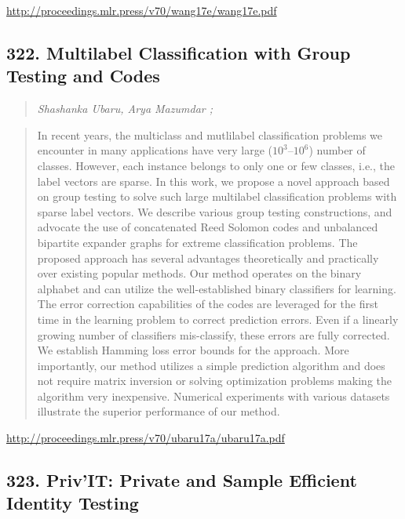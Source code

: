 \documentclass{article}
\begin{document}
\href{http://proceedings.mlr.press/v70/wang17e/wang17e.pdf}{http://proceedings.mlr.press/v70/wang17e/wang17e.pdf}

\subsection{322. Multilabel Classification with Group Testing and Codes}

\begin{quote}
\footnotesize{\textit{Shashanka Ubaru, Arya Mazumdar ;}}

\end{quote}

\begin{quote}
    In recent years, the multiclass and mutlilabel classification problems we encounter in many applications have very large ($10^3$–$10^6$) number of classes. However, each instance belongs to only one or few classes, i.e., the label vectors are sparse. In this work, we propose a novel approach based on group testing to solve such large multilabel classification problems with sparse label vectors. We describe various group testing constructions, and advocate the use of concatenated Reed Solomon codes and unbalanced bipartite expander graphs for extreme classification problems. The proposed approach has several advantages theoretically and practically over existing popular methods. Our method operates on the binary alphabet and can utilize the well-established binary classifiers for learning. The error correction capabilities of the codes are leveraged for the first time in the learning problem to correct prediction errors. Even if a linearly growing number of classifiers mis-classify, these errors are fully corrected. We establish Hamming loss error bounds for the approach. More importantly, our method utilizes a simple prediction algorithm and does not require matrix inversion or solving optimization problems making the algorithm very inexpensive. Numerical experiments with various datasets illustrate the superior performance of our method.  
\end{quote}

\href{http://proceedings.mlr.press/v70/ubaru17a/ubaru17a.pdf}{http://proceedings.mlr.press/v70/ubaru17a/ubaru17a.pdf}

\subsection{323. Priv’IT: Private and Sample Efficient Identity Testing}
\end{document}
